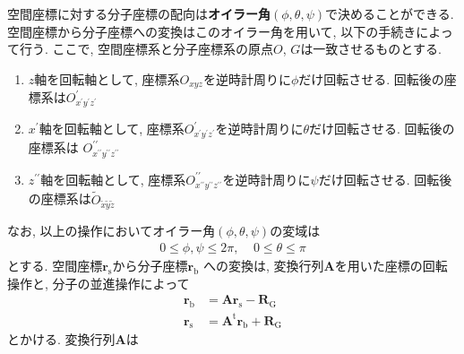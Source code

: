 空間座標に対する分子座標の配向は\textbf{オイラー角}$(\phi,\theta,\psi)$で決めることができる. 
空間座標から分子座標への変換はこのオイラー角を用いて, 以下の手続きによって行う. 
ここで, 空間座標系と分子座標系の原点$O$, $G$は一致させるものとする. 
\begin{enumerate}
 \item $z$軸を回転軸として, 座標系$O_{xyz}$を逆時計周りに$\phi$だけ回転させる. 
       回転後の座標系は$O^{\prime}_{x^{\prime}y^{\prime}z^{\prime}}$
 \item $x^{\prime}$軸を回転軸として, 座標系$O^{\prime}_{x^{\prime}y^{\prime}z^{\prime}}$を逆時計周りに$\theta$だけ回転させる. 
       回転後の座標系は
       $O^{\prime \prime}_{x^{\prime \prime} y^{\prime \prime} z^{\prime \prime}}$
 \item $z^{\prime \prime}$軸を回転軸として, 座標系$O^{\prime \prime}_{x^{\prime \prime} y^{\prime \prime} z^{\prime \prime}}$を逆時計周りに$\psi$だけ回転させる. 
       回転後の座標系は$\tilde{O}_{\tilde{x} \tilde{y} \tilde{z}}$
\end{enumerate}
なお, 以上の操作においてオイラー角$(\phi,\theta,\psi)$の変域は
\begin{align}
 0 \leq \phi,\psi \leq 2\pi,~~~~~ 0 \leq \theta \leq \pi
 \label{eq:RigidBodyMD1}
\end{align}
とする.
空間座標$\bm{r}_{\mathrm{s}}$から分子座標$\bm{r}_{\mathrm{b}}$
への変換は, 変換行列$\bm{A}$を用いた座標の回転操作と, 分子の並進操作によって
\begin{align}
 \bm{r}_{\mathrm{b}} &= \bm{A} \bm{r}_{\mathrm{s}} - \bm{R}_{\mathrm{G}}
 \label{eq:RigidBodyMD2}
 \\
 \bm{r}_{\mathrm{s}} &= \bm{A}^{\mathrm{t}} \bm{r}_{\mathrm{b}} + \bm{R}_{\mathrm{G}}
 \label{eq:RigidBodyMD3}
\end{align}
とかける. 変換行列$\bm{A}$は
